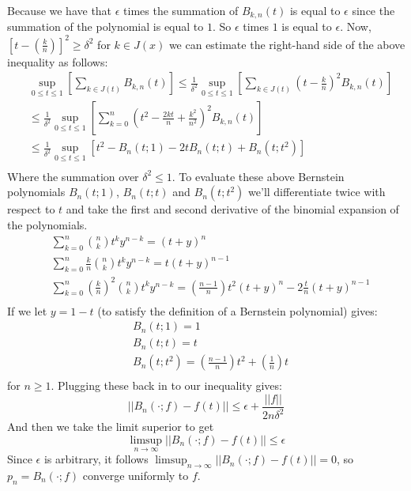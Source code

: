 \documentclass{article}
\begin{document}
Because we have that $\epsilon$ times the summation of $B_{k,n}(t)$ is equal to $\epsilon$ since the summation of the polynomial is equal to $1$.
So $\epsilon$ times $1$ is equal to $\epsilon$.
Now, $\left[ t-\left( \frac{k}{n} \right) \right]^2 \geq \delta^2$ for $k\in J(x)$ we can estimate the right-hand side of the above inequality as follows:
\begin{align*}
&\sup_{0\leq t\leq 1}\left[\sum_{k\in J(t)}B_{k,n}(t)\right]\leq\frac{1}{\delta^2}\sup_{0\leq t\leq 1}\left[\sum_{k\in J(t)}\left(t-\frac{k}{n}\right)^2 B_{k,n}(t)\right]\\
&\leq\frac{1}{\delta^2}\sup_{0\leq t\leq 1}\left[\sum_{k=0}^n\left(t^2-\frac{2kt}{n}+\frac{k^2}{n^2}\right)^2 B_{k,n}(t)\right]\\
&\leq\frac{1}{\delta^2}\sup_{0\leq t\leq 1}\left[t^2-B_n(t;1)-2tB_n(t;t)+B_n(t;t^2)\right]\\
\end{align*}
Where the summation over $\delta^2\leq1$. To evaluate these above Bernstein polynomials $B_n(t;1)$, $B_n(t;t)$ and $B_n(t;t^2)$ we’ll differentiate twice with respect to $t$ and take the first and second derivative of the binomial expansion of the polynomials.
\begin{align*}
&\sum_{k=0}^n\binom{n}{k}t^ky^{n-k}=(t+y)^n\\
&\sum_{k=0}^n\frac{k}{n}\binom{n}{k}t^ky^{n-k}=t(t+y)^{n-1}\\
&\sum_{k=0}^n\left(\frac{k}{n}\right)^2\binom{n}{k}t^ky^{n-k}=\left(\frac{n-1}{n}\right)t^2(t+y)^n-2\frac{t}{n}(t+y)^{n-1}\\
\end{align*}
If we let $y=1-t$ (to satisfy the definition of a Bernstein polynomial) gives:
\begin{align*}
&B_n(t;1)=1\\
&B_n(t;t)=t\\
&B_n(t;t^2)=\left(\frac{n-1}{n}\right)t^2+\left(\frac{1}{n}\right)t\\
\end{align*}
for $n\geq1$. Plugging these back in to our inequality gives:
\begin{equation*}
||B_n(\cdot;f)-f(t)||\leq\epsilon+\frac{||f||}{2n\delta^2}    
\end{equation*}
And then we take the limit superior to get
\begin{equation*}
\limsup_{n\rightarrow{\infty}}||B_n(\cdot;f)-f(t)||\leq\epsilon    
\end{equation*}
Since $\epsilon$ is arbitrary, it follows $\limsup_{n\rightarrow{\infty}}||B_n(\cdot;f)-f(t)|| = 0$, so $p_n = B_n(\cdot;f)$ converge uniformly to $f$.
\end{document}
